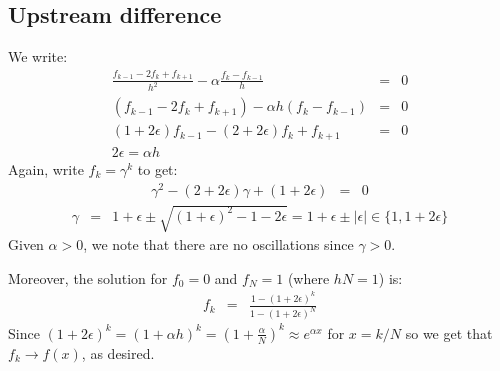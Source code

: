 \documentclass[11pt]{article}
\newcommand\eps \epsilon
\begin{document}
\subsection{Upstream difference}
We write:
\begin{eqnarray}
\frac{f_{k-1}-2f_k+f_{k+1}}{h^2} - \alpha \frac{f_k - f_{k-1}}{h} &=& 0 \\
(f_{k-1}-2f_k+f_{k+1}) - \alpha h (f_k - f_{k-1}) &=& 0 \\
(1 + 2\eps)f_{k-1}- (2 + 2\eps)f_k + f_{k+1} &=& 0 \\
2\eps = \alpha h
\end{eqnarray}
Again, write $f_k = \gamma^k$ to get:
\begin{eqnarray}
 \gamma^2 - (2 + 2\eps) \gamma + (1 + 2\eps) &=& 0 
\end{eqnarray} 
\begin{eqnarray}
\gamma &=& 1+\eps \pm \sqrt{(1+\eps)^2 - 1 - 2\eps} = 1 + \eps \pm |\eps| \in \{1, 1+2\eps\}
\end{eqnarray}
Given $\alpha > 0$, we note that there are no oscillations since $\gamma > 0$.

Moreover, the solution for $f_0 = 0$ and $f_N = 1$ (where $h N = 1$) is:
\begin{eqnarray}
f_k &=& \frac{1 - (1+2\eps)^k}{1 - (1+2\eps)^N}
\end{eqnarray}
Since $(1+2\eps)^k = (1+\alpha h)^k = \left(1 + \frac{\alpha}{N}\right)^k \approx e^{\alpha x}$ for $x = k/N$
so we get that $f_k \rightarrow f(x)$, as desired.
\end{document}
